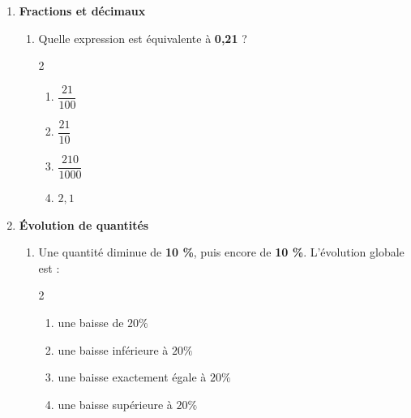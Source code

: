 \documentclass[12pt,a4paper]{article}
\begin{document}
\begin{enumerate}
\begin{enumerate}[label=\arabic{*}.\arabic*]
\item On considère :
\[
A = 10 + 0{,}1 + \frac{1}{1000}
\]
Alors :
\begin{multicols}{2}
\begin{enumerate}[label=\alph*)]
\item $A = \dfrac{20 - 1}{1000}$
\item $A = 10{,}101$
\item $A = 10{,}110$
\item $A = \dfrac{10{,}110}{1000}$
\end{enumerate}
\end{multicols}
\end{enumerate}

\item \textbf{Fractions et décimaux}

\begin{enumerate}[label=\arabic{*}.\arabic*]
\item Quelle expression est équivalente à \textbf{0,21} ?
\begin{multicols}{2}
\begin{enumerate}[label=\alph*)]
\item $\dfrac{21}{100}$
\item $\dfrac{21}{10}$
\item $\dfrac{210}{1000}$
\item $2{,}1$
\end{enumerate}
\end{multicols}
\end{enumerate}

\item \textbf{Évolution de quantités}

\begin{enumerate}[label=\arabic{*}.\arabic*]
\item Une quantité diminue de \textbf{10 \%}, puis encore de \textbf{10 \%}.  
L’évolution globale est :
\begin{multicols}{2}
\begin{enumerate}[label=\alph*)]
\item une baisse de $20 \%$
\item une baisse inférieure à $20 \%$
\item une baisse exactement égale à $20 \%$
\item une baisse supérieure à $20 \%$
\end{enumerate}
\end{multicols}
\end{enumerate}


\end{enumerate}
\end{document}
